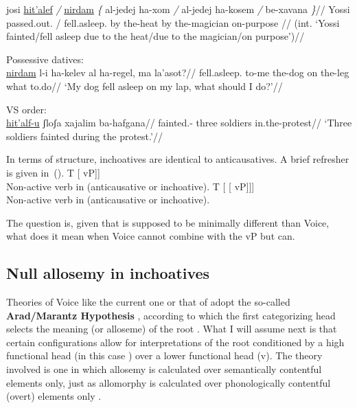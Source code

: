 {		\a \ljudge{*} \begingl
			\gla josi \underline{hit'alef} \emph{/} \underline{nirdam} \emph{\{} al-jedej ha-xom \emph{/} al-jedej ha-kosem \emph{/} be-xavana \emph{\}}//
			\glb Yossi passed.out. / fell.asleep. {} by the-heat {} by the-magician {} on-purpose {}//
			\glft (int. `Yossi fainted/fell asleep due to the heat/due to the magician/on purpose')//
		\endgl
\xe


\ex Possessive datives:\\
	\begingl
	\gla \underline{nirdam} l-i ha-kelev al ha-regel, ma la'asot?//
	\glb fell.asleep. to-me the-dog on the-leg what to.do//
	\glft `My dog fell asleep on my lap, what should I do?'//
	\endgl
\xe

\ex VS order:\\
	\begingl
	\gla \underline{hit'alf-u} ʃloʃa xajalim ba-hafgana//
	\glb fainted.- three soldiers in.the-protest//
	\glft `Three soldiers fainted during the protest.'//
	\endgl
\xe

In terms of structure, inchoatives are identical to anticausatives. A brief refresher is given in~(\nextx).
\pex
	\a {[}T [{\vz} vP]]\\
	Non-active verb in {\tnif} (anticausative or inchoative).
	\a {[}T [{\vz} [{\va} vP]]]\\
	Non-active verb in {\thit} (anticausative or inchoative).
\xe

The question is, given that {\vz} is supposed to be minimally different than Voice, what does it mean when Voice cannot combine with the vP but {\vz} can.

  \subsection{Null allosemy in inchoatives} \label{vz:inch:analysis}
Theories of Voice like the current one or that of \cite{layering15} adopt the so-called \textbf{Arad/Marantz Hypothesis} \citep{elenasamioti14}, according to which the first categorizing head selects the meaning (or alloseme) of the root \citep{arad03,marantz13}. What I will assume next is that certain configurations allow for interpretations of the root conditioned by a high functional head (in this case {\vz}) over a lower functional head (v). The theory involved is one in which allosemy is calculated over semantically contentful elements only, just as allomorphy is calculated over phonologically contentful (overt) elements only \citep{marantz13,kastner18nllt}.

}
